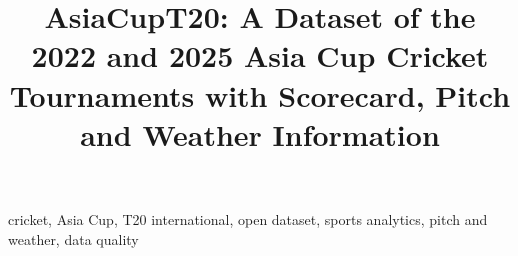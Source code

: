 \documentclass[conference]{IEEEtran}
\begin{document}
\title{AsiaCupT20: A Dataset of the 2022 and 2025 Asia Cup Cricket Tournaments with Scorecard, Pitch and Weather Information}

\author{
\and
{}
\and
{}
}

\maketitle

\begin{abstract}

\end{abstract}

\begin{IEEEkeywords}
cricket, Asia Cup, T20 international, open dataset, sports analytics, pitch and weather, data quality
\end{IEEEkeywords}











\end{document}
